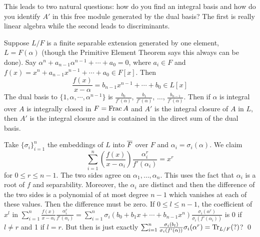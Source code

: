 This leads to two natural questions: how do you find an integral basis and how do you identify $A'$ in this free module generated by the dual basis? The first is really linear algebra while the second leads to discriminants. 

\begin{thm}
Suppose $L/F$ is a finite separable extension generated by one element, $L=F(\alpha)$ (though the Primitive Element Theorem says this always can be done). Say $\alpha^n+a_{n-1}\alpha^{n-1}+\cdots+a_0=0$, where $a_i \in F$ and $f(x)=x^n+a_{n-1}x^{n-1}+\cdots+a_0 \in F[x]$. Then
	\[
	\dfrac{f(x)}{x-\alpha}= b_{n-1} x^{n-1}+ \cdots +b_0 \in L[x]
	\]
The dual basis to $\{1,\alpha,\cdots,\alpha^{n-1}\}$ is $\frac{b_0}{f'(\alpha)}$, $\frac{b_1}{f'(\alpha)}$, $\ldots$, $\frac{b_{n-1}}{f'(\alpha)}$. Then if  $\alpha$ is integral over $A$ is integrally closed in $F=\operatorname{Frac} A$ and $A'$ is the integral closure of $A$ in $L$, then $A'$ is the integral closure and is contained in the direct sum of the dual basis.
\end{thm}

\pf Take $\{\sigma_i\}_{i=1}^n$ the embeddings of $L$ into $\overline{F}$ over $F$ and $\alpha_i=\sigma_i(\alpha)$. We claim
	\[
	\sum_{i=1}^n \left(\frac{f(x)}{x-\alpha_i} \right) \dfrac{\alpha_i^r}{f'(\alpha_i)} = x^r
	\]
for $0 \leq r \leq n-1$. The two sides agree on $\alpha_1,\ldots,\alpha_n$. This uses the fact that $\alpha_i$ is a root of $f$ and separability. Moreover, the $\alpha_i$ are distinct and then the difference of the two sides is a polynomial of at most degree $n-1$ which vanishes at each of these values. Then the difference must be zero. If $0 \leq l \leq n-1$, the coefficient of $x^l$ in $\sum_{i=1}^n \frac{f(x)}{x-\alpha_i} \frac{\alpha_i^r}{f'(\alpha_i)}= \sum_{i=1}^n \sigma_i (b_0+b_1x+\cdots+b_{n-1}x^n) \frac{\sigma_i(\alpha^r)}{\sigma_i(f'(\alpha_i))}$ is 0 if $l \neq r$ and 1 if $l=r$. But then is just exactly $\sum_{i=1}^n \frac{\sigma_i(b_l)}{\sigma_i(f'(\alpha))}\sigma_i(\alpha^r) = \text{Tr}_{L/F}(?)$? \qed \\

